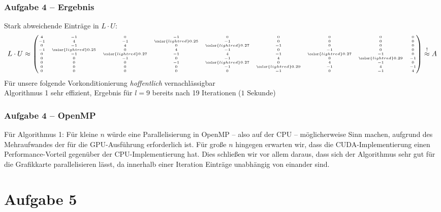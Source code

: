 \documentclass[german,notes,18pt]{beamer}
\begin{document}
	\begin{frame}
		\frametitle{Aufgabe 4 -- Ergebnis}
		Stark abweichende Einträge in $L\cdot U$:
		\begin{equation*}
		\tiny
		L\cdot U\approx \begin{pmatrix}
		4 & -1 &  0 & -1 &  0 & 0 &  0  & 0  & 0 \\
		-1  & 4 & -1 &  \color{lightred}0.25 & -1 &  0 &  0 &  0 &  0 \\
		0 & -1  & 4 &  0 &  \color{lightred}0.27 & -1  & 0  & 0  & 0 \\
		-1 &  \color{lightred}0.25 &  0 &  4 & -1 &  0 & -1 &  0 &  0 \\
		0 & -1 &  \color{lightred}0.27 & -1 &  4 & -1  & \color{lightred}0.27 & -1 &  0 \\
		0 &  0 & -1 &  0 & -1 &  4 &  0 & \color{lightred}0.29 & -1 \\
		0 &  0 &  0 & -1 &  \color{lightred}0.27 &  0 &  4 & -1 &  0 \\
		0 &  0 &  0 &  0 & -1 &  \color{lightred}0.29 & -1 &  4 & -1 \\
		0 &  0 &  0 &  0 &  0 & -1 &  0 & -1 &  4
		\end{pmatrix}
		\stackrel{!}{\approx}A
		\end{equation*}
		\vspace{2em}
		Für unsere folgende Vorkonditionierung \emph{hoffentlich} vernachlässigbar \\
		\vspace{2em}
		Algorithmus 1 sehr effizient, Ergebnis für $l=9$ bereits nach 19 Iterationen ($1$ Sekunde)
	\end{frame}
	\begin{frame}
		\frametitle{Aufgabe 4 -- OpenMP}
		Für Algorithmus 1: Für kleine $n$ würde eine Parallelisierung in OpenMP -- also auf der CPU -- möglicherweise Sinn machen, aufgrund des Mehraufwandes der für die GPU-Ausführung erforderlich ist. Für große $n$ hingegen erwarten wir, dass die CUDA-Implementierung einen Performance-Vorteil gegenüber der CPU-Implementierung hat. Dies schließen wir vor allem daraus, dass sich der Algorithmus sehr gut für die Grafikkarte parallelisieren lässt, da innerhalb einer Iteration Einträge unabhängig von einander sind.
	\end{frame}


	\section{Aufgabe 5}
\end{document}
